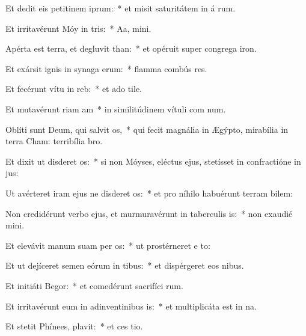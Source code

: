 \item Et dedit eis petitinem iprum:~* et misit saturitátem in á rum.
\item Et irritavérunt Móy in tris:~* Aa,  mini.
\item Apérta est terra, et degluvit than:~* et opéruit super congrega iron.
\item Et exársit ignis in synaga erum:~* flamma combús res.
\item Et fecérunt vítu in reb:~* et ado tile.
\item Et mutavérunt riam am~* in similitúdinem vítuli com num.
\item Oblíti sunt Deum, qui salvit os,~* qui fecit magnália in Ægýpto, mirabília in terra Cham: terribília   bro.
\item Et dixit ut disderet os:~* si non Móyses, eléctus ejus, stetísset in confractióne in  jus:
\item Ut avérteret iram ejus ne disderet os:~* et pro níhilo habuérunt terram bilem:
\item Non credidérunt verbo ejus, et murmuravérunt in taberculis is:~* non exaudié  mini.
\item Et elevávit manum suam per os:~* ut prostérneret e  to:
\item Et ut dejíceret semen eórum in tibus:~* et dispérgeret eos  nibus.
\item Et initiáti  Begor:~* et comedérunt sacrifíci rum.
\item Et irritavérunt eum in adinventinibus is:~* et multiplicáta est in  na.
\item Et stetit Phínees,  plavit:~* et ces tio.
